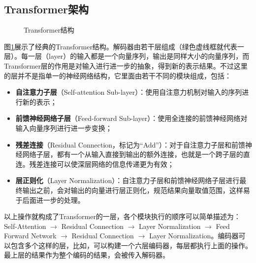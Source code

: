 \subsection{Transformer架构}
\begin{figure}[htp]
\centering

\caption{ Transformer结构}
\label{fig:6-39}
\end{figure}

\parinterval 图\ref{fig:6-39}展示了经典的Transformer结构。解码器由若干层组成（绿色虚线框就代表一层）。每一层（layer）的输入都是一个向量序列，输出是同样大小的向量序列，而Transformer层的作用是对输入进行进一步的抽象，得到新的表示结果。不过这里的层并不是指单一的神经网络结构，它里面由若干不同的模块组成，包括：

\begin{itemize}
\vspace{0.5em}
\item {\small\sffamily\bfseries{自注意力子层}}（Self-attention Sub-layer）：使用自注意力机制对输入的序列进行新的表示；
\vspace{0.5em}
\item {\small\sffamily\bfseries{前馈神经网络子层}}（Feed-forward Sub-layer）：使用全连接的前馈神经网络对输入向量序列进行进一步变换；
\vspace{0.5em}
\item {\small\sffamily\bfseries{残差连接}}（Residual Connection，标记为``Add''）：对于自注意力子层和前馈神经网络子层，都有一个从输入直接到输出的额外连接，也就是一个跨子层的直连。残差连接可以使深层网络的信息传递更为有效；
\vspace{0.5em}
\item {\small\sffamily\bfseries{层正则化}}（Layer Normalization）：自注意力子层和前馈神经网络子层进行最终输出之前，会对输出的向量进行层正则化，规范结果向量取值范围，这样易于后面进一步的处理。
\vspace{0.5em}
\end{itemize}

\parinterval 以上操作就构成了Transformer的一层，各个模块执行的顺序可以简单描述为：Self-Attention $\to$ Residual Connection $\to$ Layer Normalization $\to$ Feed Forward Network $\to$ Residual Connection $\to$ Layer Normalization。编码器可以包含多个这样的层，比如，可以构建一个六层编码器，每层都执行上面的操作。最上层的结果作为整个编码的结果，会被传入解码器。

